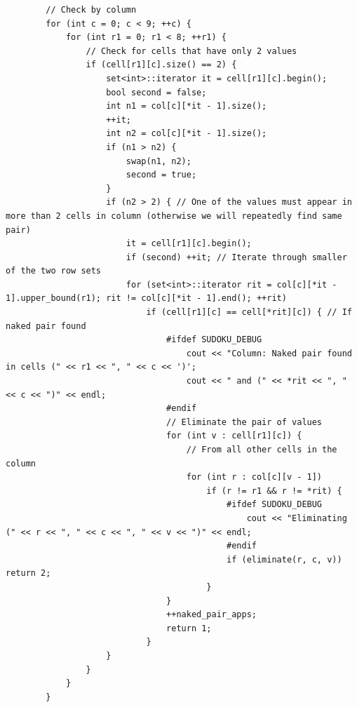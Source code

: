 \documentclass{article}
\begin{document}
\begin{lstlisting}
        // Check by column
        for (int c = 0; c < 9; ++c) {
            for (int r1 = 0; r1 < 8; ++r1) {
                // Check for cells that have only 2 values
                if (cell[r1][c].size() == 2) {
                    set<int>::iterator it = cell[r1][c].begin();
                    bool second = false;
                    int n1 = col[c][*it - 1].size();
                    ++it;
                    int n2 = col[c][*it - 1].size();
                    if (n1 > n2) {
                        swap(n1, n2);
                        second = true;
                    }
                    if (n2 > 2) { // One of the values must appear in more than 2 cells in column (otherwise we will repeatedly find same pair)
                        it = cell[r1][c].begin();
                        if (second) ++it; // Iterate through smaller of the two row sets
                        for (set<int>::iterator rit = col[c][*it - 1].upper_bound(r1); rit != col[c][*it - 1].end(); ++rit)
                            if (cell[r1][c] == cell[*rit][c]) { // If naked pair found
                                #ifdef SUDOKU_DEBUG
                                    cout << "Column: Naked pair found in cells (" << r1 << ", " << c << ')';
                                    cout << " and (" << *rit << ", " << c << ")" << endl;
                                #endif
                                // Eliminate the pair of values
                                for (int v : cell[r1][c]) {
                                    // From all other cells in the column
                                    for (int r : col[c][v - 1])
                                        if (r != r1 && r != *rit) {
                                            #ifdef SUDOKU_DEBUG
                                                cout << "Eliminating (" << r << ", " << c << ", " << v << ")" << endl;
                                            #endif
                                            if (eliminate(r, c, v)) return 2;
                                        }
                                }
                                ++naked_pair_apps;
                                return 1;
                            }
                    }
                }
            }
        }


\end{lstlisting}
\end{document}
